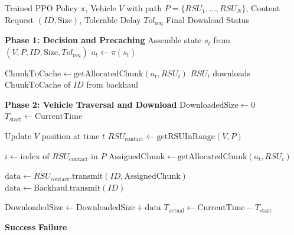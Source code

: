 \begin{algorithm}[h!]
\caption{PPO-based Delay Tolerant Precaching}
\label{alg:ppo-dtp}
\begin{algorithmic}[1] 
\REQUIRE Trained PPO Policy $\pi$, Vehicle $V$ with path $P = \{RSU_1, \dots, RSU_N\}$, Content Request $(ID, \text{Size})$, Tolerable Delay $Tol_{\text{req}}$
\ENSURE Final Download Status

\vspace{1.5mm}
\STATE \textbf{Phase 1: Decision and Precaching}
\STATE Assemble state $s_t$ from $(V, P, ID, \text{Size}, Tol_{\text{req}})$
\STATE $a_t \leftarrow \pi(s_t)$ 

    \STATE $\text{ChunkToCache} \leftarrow \text{getAllocatedChunk}(a_t, RSU_i)$
        \STATE $RSU_i$ downloads $\text{ChunkToCache}$ of $ID$ from backhaul
    \ENDIF
\ENDFOR

\vspace{2mm}
\STATE \textbf{Phase 2: Vehicle Traversal and Download}
\STATE $\text{DownloadedSize} \leftarrow 0$
\STATE $T_{\text{start}} \leftarrow \text{CurrentTime}$

    \STATE Update $V$ position at time $t$
    \STATE $RSU_{\text{contact}} \leftarrow \text{getRSUInRange}(V, P)$
    
        \STATE $i \leftarrow \text{index of } RSU_{\text{contact}} \text{ in } P$
        \STATE $\text{AssignedChunk} \leftarrow \text{getAllocatedChunk}(a_t, RSU_i)$
        
            \STATE $\text{data} \leftarrow RSU_{\text{contact}}.\text{transmit}(ID, \text{AssignedChunk})$
        \ELSE
            \STATE $\text{data} \leftarrow \text{Backhaul.transmit}(ID)$
        \ENDIF
        
        \STATE $\text{DownloadedSize} \leftarrow \text{DownloadedSize} + \text{data}$
    \ENDIF
\ENDWHILE
\STATE $T_{\text{actual}} \leftarrow \text{CurrentTime} - T_{\text{start}}$

    \RETURN \textbf{Success}
\ELSE
    \RETURN \textbf{Failure} 
\ENDIF
\end{algorithmic}
\end{algorithm}

